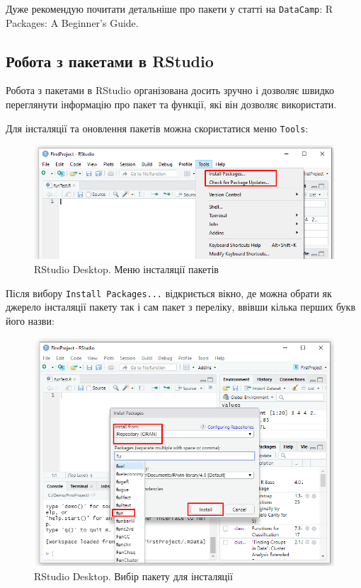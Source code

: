 \documentclass[
]{book}
\begin{document}
Дуже рекомендую почитати детальніше про пакети у статті на \texttt{DataCamp}:
R Packages: A Beginner's Guide.

\hypertarget{chapter142}{%
\subsection{Робота з пакетами в RStudio}\label{chapter142}}

Робота з пакетами в RStudio організована досить зручно і дозволяє швидко переглянути інформацію про пакет та функції, які він дозволяє використати.

Для інсталяції та оновлення пакетів можна скористатися меню \texttt{Tools}:

\begin{figure}
\includegraphics[width=10.57in]{images/chapter1/packages_1} \caption{RStudio Desktop. Меню інсталяції пакетів}\label{fig:unnamed-chunk-31}
\end{figure}

Після вибору \texttt{Install\ Packages...} відкриється вікно, де можна обрати як джерело інсталяції пакету так і сам пакет з переліку, ввівши кілька перших букв його назви:

\begin{figure}
\includegraphics[width=10.65in]{images/chapter1/packages_2} \caption{RStudio Desktop. Вибір пакету для інсталяції}\label{fig:unnamed-chunk-32}
\end{figure}
\end{document}
